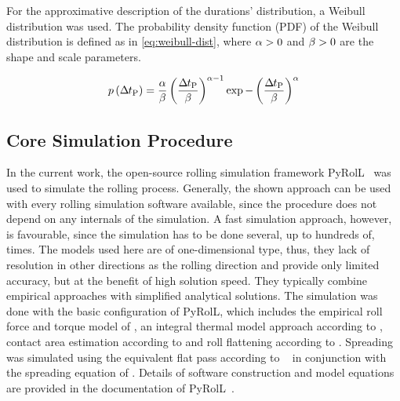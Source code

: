 For the approximative description of the durations' distribution, a Weibull distribution was used.
The probability density function (PDF) of the Weibull distribution is defined as in \autoref{eq:weibull-dist},
where ${\alpha} > 0$ and ${\beta} > 0$ are the shape and scale parameters.

\begin{equation}
    p\left({{\Delta\mspace{-1mu}t}_\mathrm{P}} \right)=\frac{{\alpha}}{{\beta}} \left(\frac{{{\Delta\mspace{-1mu}t}_\mathrm{P}}}{{\beta}}\right)^{{\alpha}-1}\exp -\left(\frac{{{\Delta\mspace{-1mu}t}_\mathrm{P}}}{{\beta}} \right)^{{\alpha}}
    \label{eq:weibull-dist}
\end{equation}

\subsection{Core Simulation Procedure}\label{subsec:simulation-procedure}

In the current work, the open-source rolling simulation framework PyRolL~\cite{pyroll2} was used to simulate the rolling process.
Generally, the shown approach can be used with every rolling simulation software available, since the procedure does not depend on any internals of the simulation.
A fast simulation approach, however, is favourable, since the simulation has to be done several, up to hundreds of, times.
The models used here are of one-dimensional type, thus, they lack of resolution in other directions as the rolling direction and provide only limited accuracy, but at the benefit of high solution speed.
They typically combine empirical approaches with simplified analytical solutions.
The simulation was done with the basic configuration of PyRolL, which includes the empirical roll force and torque model of \textcite{Hensel1978}, an integral thermal model approach according to \textcite{Hensel1990}, contact area estimation according to \textcite{Zouhar1960} and roll flattening according to \textcite{Hitchcock1935}.
Spreading was simulated using the equivalent flat pass according to \citeauthor*{Lendl1948}~\cite{Lendl1948, Lendl1948a, Lendl1949} in conjunction with the spreading equation of \textcite{Wusatowski1969}.
Details of software construction and model equations are provided in the documentation of PyRolL~\cite{pyroll}.



